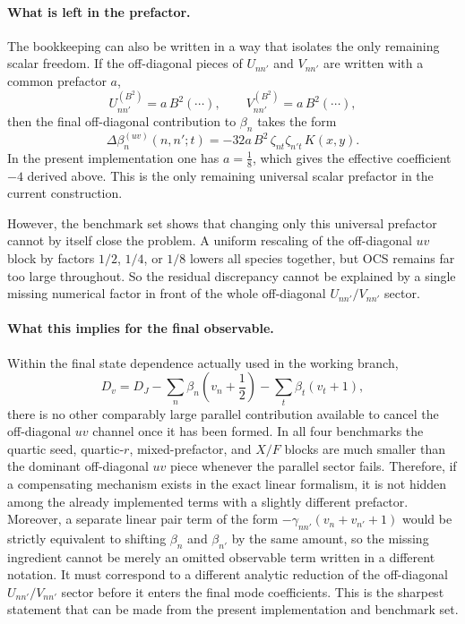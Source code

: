 \documentclass[11pt]{article}
\begin{document}
\paragraph{What is left in the prefactor.}
The bookkeeping can also be written in a way that isolates the only remaining
scalar freedom. If the off-diagonal pieces of $U_{nn'}$ and $V_{nn'}$ are
written with a common prefactor $a$,
\[
U_{nn'}^{(B^2)} = a\,B^2(\cdots),
\qquad
V_{nn'}^{(B^2)} = a\,B^2(\cdots),
\]
then the final off-diagonal contribution to $\beta_n$ takes the form
\[
\Delta\beta_n^{(uv)}(n,n';t)=
-32a\,B^2\,\zeta_{nt}\zeta_{n't}\,K(x,y).
\]
In the present implementation one has $a=\tfrac18$, which gives the effective
coefficient $-4$ derived above. This is the only remaining universal scalar
prefactor in the current construction.

However, the benchmark set shows that changing only this universal prefactor
cannot by itself close the problem. A uniform rescaling of the off-diagonal
$uv$ block by factors $1/2$, $1/4$, or $1/8$ lowers all species together, but
OCS remains far too large throughout. So the residual discrepancy cannot be
explained by a single missing numerical factor in front of the whole
off-diagonal $U_{nn'}/V_{nn'}$ sector.

\paragraph{What this implies for the final observable.}
Within the final state dependence actually used in the working branch,
\[
D_v = D_J - \sum_n \beta_n\left(v_n+\frac{1}{2}\right)-\sum_t\beta_t(v_t+1),
\]
there is no other comparably large parallel contribution available to cancel
the off-diagonal $uv$ channel once it has been formed. In all four benchmarks
the quartic seed, quartic-$r$, mixed-prefactor, and $X/F$ blocks are much
smaller than the dominant off-diagonal $uv$ piece whenever the parallel sector
fails. Therefore, if a compensating mechanism exists in the exact linear
formalism, it is not hidden among the already implemented terms with a slightly
different prefactor. Moreover, a separate linear pair term of the form
$-\gamma_{nn'}(v_n+v_{n'}+1)$ would be strictly equivalent to shifting
$\beta_n$ and $\beta_{n'}$ by the same amount, so the missing ingredient
cannot be merely an omitted observable term written in a different notation. It
must correspond to a different analytic reduction of the off-diagonal
$U_{nn'}/V_{nn'}$ sector before it enters the final mode coefficients.
This is the sharpest statement that can be made from the present implementation
and benchmark set.
\end{document}
